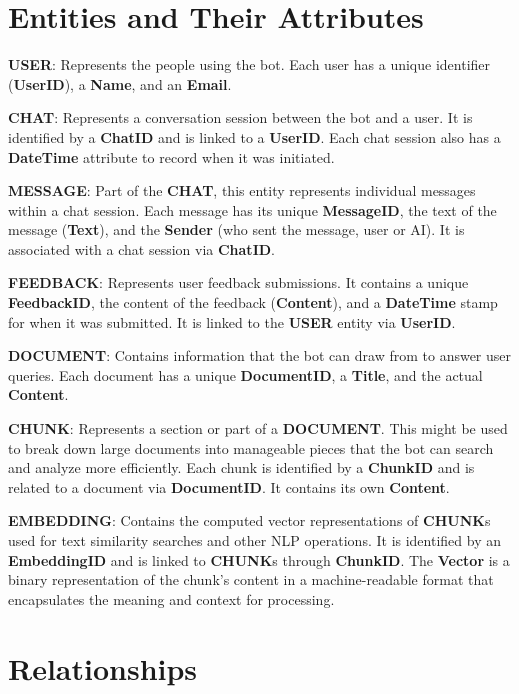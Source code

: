\documentclass{l4proj}
\begin{document}
\section*{Entities and Their Attributes}

\textbf{USER}: Represents the people using the bot. Each user has a unique identifier (\textbf{UserID}), a \textbf{Name}, and an \textbf{Email}.

\textbf{CHAT}: Represents a conversation session between the bot and a user. It is identified by a \textbf{ChatID} and is linked to a \textbf{UserID}. Each chat session also has a \textbf{DateTime} attribute to record when it was initiated.

\textbf{MESSAGE}: Part of the \textbf{CHAT}, this entity represents individual messages within a chat session. Each message has its unique \textbf{MessageID}, the text of the message (\textbf{Text}), and the \textbf{Sender} (who sent the message, user or AI). It is associated with a chat session via \textbf{ChatID}.

\textbf{FEEDBACK}: Represents user feedback submissions. It contains a unique \textbf{FeedbackID}, the content of the feedback (\textbf{Content}), and a \textbf{DateTime} stamp for when it was submitted. It is linked to the \textbf{USER} entity via \textbf{UserID}.

\textbf{DOCUMENT}: Contains information that the bot can draw from to answer user queries. Each document has a unique \textbf{DocumentID}, a \textbf{Title}, and the actual \textbf{Content}.

\textbf{CHUNK}: Represents a section or part of a \textbf{DOCUMENT}. This might be used to break down large documents into manageable pieces that the bot can search and analyze more efficiently. Each chunk is identified by a \textbf{ChunkID} and is related to a document via \textbf{DocumentID}. It contains its own \textbf{Content}.

\textbf{EMBEDDING}: Contains the computed vector representations of \textbf{CHUNK}s used for text similarity searches and other NLP operations. It is identified by an \textbf{EmbeddingID} and is linked to \textbf{CHUNK}s through \textbf{ChunkID}. The \textbf{Vector} is a binary representation of the chunk's content in a machine-readable format that encapsulates the meaning and context for processing.

\section*{Relationships}
\end{document}
